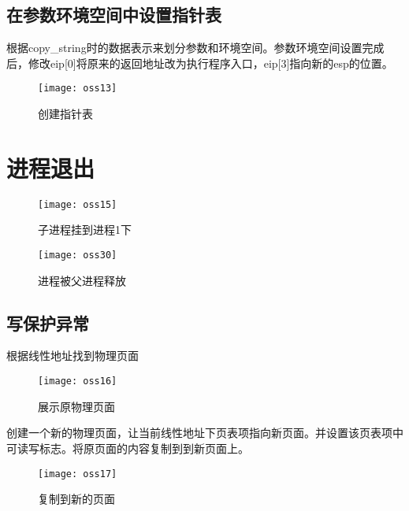 \documentclass[]{report}
\begin{document}
\subsection{在参数环境空间中设置指针表}
根据copy\_string时的数据表示来划分参数和环境空间。参数环境空间设置完成后，修改eip[0]将原来的返回地址改为执行程序入口，eip[3]指向新的esp的位置。
\begin{figure}[H]%
	\centering  %
	\texttt{[image: oss13]}  
	\caption{创建指针表}  %
	\label{fig33}
\end{figure}
\section{进程退出}
\begin{figure}[H]%
	\centering  %
	\texttt{[image: oss15]}  
	\caption{子进程挂到进程1下}  %
	\label{fig34}
\end{figure}
\begin{figure}[H]%
	\centering  %
	\texttt{[image: oss30]}  
	\caption{进程被父进程释放}  %
	\label{fig49}
\end{figure}
\subsection{写保护异常}
根据线性地址找到物理页面
\begin{figure}[H]%
	\centering  %
	\texttt{[image: oss16]}  
	\caption{展示原物理页面}  %
	\label{fig35}
\end{figure}
创建一个新的物理页面，让当前线性地址下页表项指向新页面。并设置该页表项中可读写标志。将原页面的内容复制到到新页面上。
\begin{figure}[H]%
	\centering  %
	\texttt{[image: oss17]}  
	\caption{复制到新的页面}  %
	\label{fig36}
\end{figure}
\end{document}
